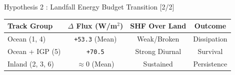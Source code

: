 \begin{frame}{Hypothesis 2 : Landfall Energy Budget Transition [2/2]}
	\vspace{0.1cm}
	\begin{center}
		\begin{tabular}{lccc}
			\toprule
			\textbf{Track Group} & \textbf{$\Delta$ Flux (W/m$^2$)} & \textbf{SHF Over Land} & \textbf{Outcome} \\
			\midrule
			Ocean (1, 4)         & \texttt{+53.3} (Mean)            & Weak/Broken            & Dissipation      \\
			Ocean + IGP (5)      & \texttt{+70.5}                   & Strong Diurnal         & Survival         \\
			Inland (2, 3, 6)     & $\approx 0$ (Mean)               & Sustained              & Persistence      \\
			\bottomrule
		\end{tabular}
	\end{center}
\end{frame}

